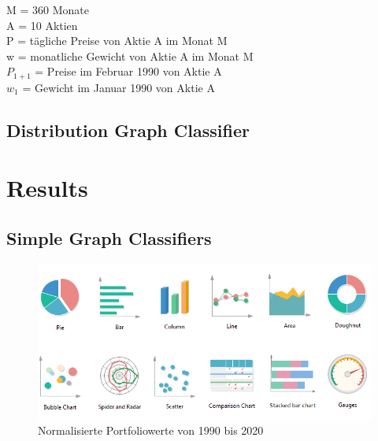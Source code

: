 \documentclass[12pt]{article}
\begin{document}
            \begin{multicols}{2}
                \begin{footnotesize}
                    
                    \noindent M = 360 Monate \\
                    A = 10 Aktien \\
                    P = tägliche Preise von Aktie A im Monat M \\
                    w = monatliche Gewicht von Aktie A im Monat M \\
                    $P_{1+1}$ = Preise im Februar 1990 von Aktie A \\
                    $w_1$ = Gewicht im Januar 1990 von Aktie A 

                \end{footnotesize}
            \end{multicols}

        \subsection{Distribution Graph Classifier}

    \section{Results}
    
        \subsection{Simple Graph Classifiers}

         


            \begin{figure}[ht]
            
                \begin{center}

                    \includegraphics[scale=0.5]{types-of-graphs.png}
                    \caption{Normalisierte Portfoliowerte von 1990 bis 2020}
                    \label{n-portfoliowerte-fig}
        
                \end{center}
                
            \end{figure}
\end{document}
